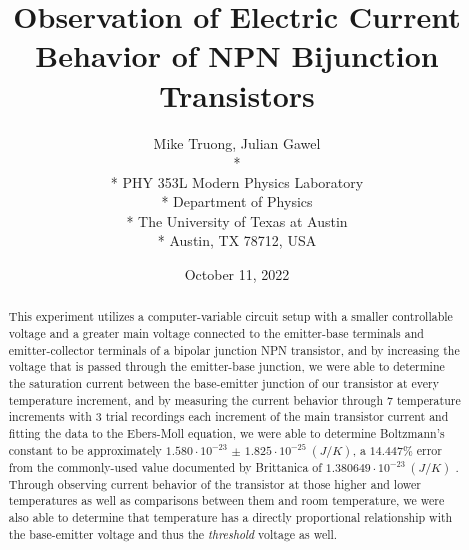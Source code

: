 \documentclass[10pt,letterpaper,onecolumn]{article}
\begin{document}

\title{\Large\bf Observation of Electric Current Behavior of NPN Bijunction Transistors}

\author{
 Mike Truong, Julian Gawel \\*
  \\*
 PHY 353L Modern Physics Laboratory \\*
 Department of Physics \\*
 The University of Texas at Austin \\*
 Austin, TX 78712, USA
}
\date{October 11, 2022}


\maketitle


\begin{abstract}


This experiment utilizes a computer-variable circuit setup with a smaller controllable voltage and a greater main voltage connected to the emitter-base terminals and emitter-collector terminals of a bipolar junction NPN transistor, and by increasing the voltage that is passed through the emitter-base junction, we were able to determine the saturation current between the base-emitter junction of our transistor at every temperature increment, and by measuring the current behavior through 7 temperature increments with 3 trial recordings each increment of the main transistor current and fitting the data to the Ebers-Moll equation, we were able to determine Boltzmann's constant to be approximately $1.580\cdot 10^{-23}$ $\pm$ $1.825\cdot 10^{-25}\ (J/K)$, a $14.447\%$ error from the commonly-used value documented by Brittanica of $1.380649\cdot 10^{-23}\ (J/K)$ \cite{k}. Through observing current behavior of the transistor at those higher and lower temperatures as well as comparisons between them and room temperature, we were also able to determine that temperature has a directly proportional relationship with the base-emitter voltage and thus the {\it threshold} voltage as well.


\end{abstract}
\end{document}
